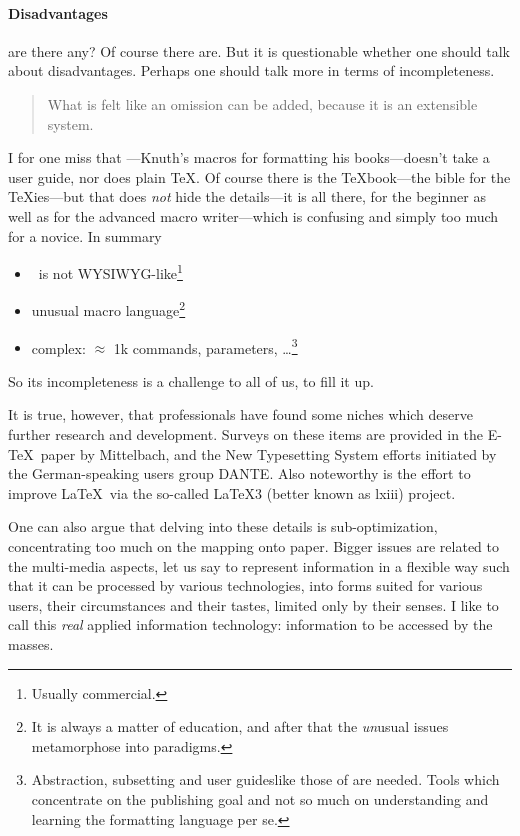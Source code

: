 \paragraph*{Disadvantages}are there any?
Of course there are. But it is questionable
whether one should talk about disadvantages.
Perhaps one should talk more in terms of incompleteness.
\begin{quote}
What is felt like an omission can be added,
because it is an extensible system.
\end{quote}
I for one miss that \mmt---Knuth's macros for formatting his books---doesn't
take a user guide, nor does plain \TeX.
Of course there is the \TeX book---the bible for the \TeX ies---but that does
{\em not\/} hide the details---it is all there, for the beginner as
well as for the advanced macro writer---which is confusing
and simply too much for a novice. In summary
\begin{itemize}
\item \AllTeX\ is not
      WYSIWYG-like\footnote{Usually commercial.}
\item unusual macro language\footnote{It is always a matter of education,
      and after that the {\em un\/}usual issues metamorphose into paradigms.}
\item complex: $\approx$ 1k commands, parameters, \ldots\footnote{Abstraction,
   subsetting and user guides\Dash like those of \AmSTeX\Dash are needed.
   Tools which concentrate on the publishing goal and not so much on
   understanding and learning the formatting language per se.}
\end{itemize}
So its incompleteness is a challenge to all of us, to fill it up.

It is true, however, that professionals have found some niches which deserve
further research and development. Surveys on these items are provided in
the E-\TeX\ paper by Mittelbach, and the New Typesetting System efforts
initiated by the German-speaking users group DANTE.
Also noteworthy is the effort to improve
\LaTeX\ via the so-called \LaTeX3 (better known as lxiii) project.

One can also argue that delving into these details is sub-optimization,
concentrating too much on the mapping onto paper. Bigger issues are
related to the multi-media aspects, let us say to represent information
in a flexible way such that it can be processed by various technologies,
into forms suited for various users, their circumstances and their
tastes, limited only by their senses.
I like to call this {\em real\/} applied information technology:
information to be accessed by the masses.

